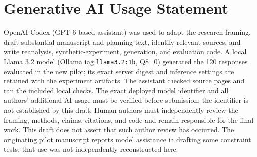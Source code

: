 \documentclass[manuscript,screen,review,anonymous]{acmart}
\begin{document}
\section*{Generative AI Usage Statement}
OpenAI Codex (GPT-6-based assistant) was used to adapt the research framing, draft substantial manuscript and planning text, identify relevant sources, and write reanalysis, synthetic-experiment, generation, and evaluation code. A local Llama 3.2 model (Ollama tag \texttt{llama3.2:1b}, Q8\_0) generated the 120 responses evaluated in the new pilot; its exact server digest and inference settings are retained with the experiment artifacts. The assistant checked source pages and ran the included local checks. The exact deployed model identifier and all authors' additional AI usage must be verified before submission; the identifier is not established by this draft. Human authors must independently review the framing, methods, claims, citations, and code and remain responsible for the final work. This draft does not assert that such author review has occurred. The originating pilot manuscript reports model assistance in drafting some constraint tests; that use was not independently reconstructed here.
\end{document}
